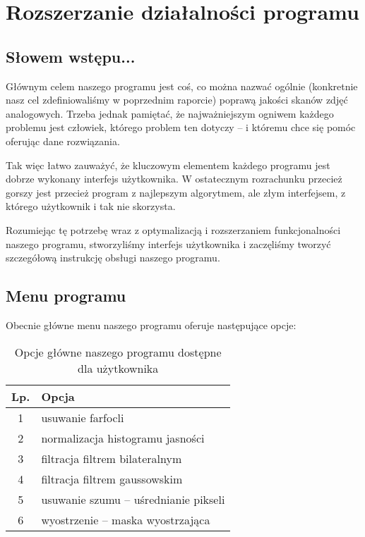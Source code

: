 \documentclass[]{mwart}
\begin{document}
\section{Rozszerzanie działalności programu}
\subsection{Słowem wstępu...}
Głównym celem naszego programu jest coś, co można nazwać
ogólnie (konkretnie nasz cel zdefiniowaliśmy w poprzednim raporcie)
poprawą jakości skanów zdjęć analogowych. Trzeba jednak pamiętać,
że najważniejszym ogniwem każdego problemu jest człowiek, którego
problem ten dotyczy -- i któremu chce się pomóc oferując dane rozwiązania. \newline

Tak więc łatwo zauważyć, że kluczowym elementem każdego programu jest dobrze wykonany
interfejs użytkownika. W ostatecznym rozrachunku przecież gorszy
jest przecież program z najlepszym algorytmem, ale złym interfejsem, z którego użytkownik i tak nie skorzysta. \newline


Rozumiejąc tę potrzebę wraz z optymalizacją i rozszerzaniem funkcjonalności
naszego programu, stworzyliśmy interfejs użytkownika i zaczęliśmy %
tworzyć szczegółową instrukcję obsługi naszego programu.

\subsection{Menu programu}
Obecnie główne menu naszego programu oferuje następujące opcje:

\begin{table}[h]
    \centering
    \begin{tabular}{|c|l|}
        \hline
        Lp. & Opcja                                 \\ \hline
        1   & usuwanie farfocli                     \\ \hline       %
        2   & normalizacja histogramu jasności      \\ \hline       %
        3   & filtracja filtrem bilateralnym        \\ \hline       %
        4   & filtracja filtrem gaussowskim         \\ \hline       %
        5   & usuwanie szumu -- uśrednianie pikseli \\ \hline       %
        6   & wyostrzenie -- maska wyostrzająca     \\ \hline       %
    \end{tabular}
    \caption{Opcje główne naszego programu dostępne dla użytkownika}
\end{table}
\end{document}
